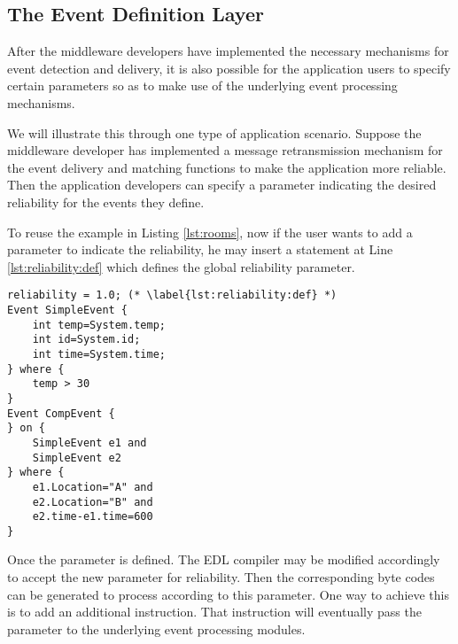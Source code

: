 \subsection{The Event Definition Layer}
After the middleware developers have implemented the necessary mechanisms for event detection and delivery, it is also possible for the application users to specify certain parameters so as to make use of the underlying event processing mechanisms.

We will illustrate this through one type of application scenario. Suppose the middleware developer has implemented a message retransmission mechanism for the event delivery and matching functions to make the application more reliable. Then the application developers can specify a parameter indicating the desired reliability for the events they define. 

To reuse the example in Listing \ref{lst:rooms}, now if the user wants to add a parameter to indicate the reliability, he may insert a statement at Line \ref{lst:reliability:def} which defines the global reliability parameter.

\begin{lstlisting}[caption=Example of event definition with reliability, label=lst:reliability]
reliability = 1.0; (* \label{lst:reliability:def} *)
Event SimpleEvent {
	int temp=System.temp;
	int id=System.id;
	int time=System.time;
} where {
	temp > 30
}
Event CompEvent {
} on {
	SimpleEvent e1 and
	SimpleEvent e2
} where {
	e1.Location="A" and
	e2.Location="B" and
	e2.time-e1.time=600
}
\end{lstlisting}

Once the parameter is defined. The EDL compiler may be modified accordingly to accept the new parameter for reliability. Then the corresponding byte codes can be generated to process according to this parameter. One way to achieve this is to add an additional instruction. That instruction will eventually pass the parameter to the underlying event processing modules.